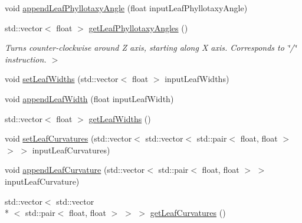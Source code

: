 \begin{DoxyCompactItemize}
void \hyperlink{classLSystemParameters_abfe638849fd39e447a12231b1ca22a50}{append\-Leaf\-Phyllotaxy\-Angle} (float input\-Leaf\-Phyllotaxy\-Angle)
\item 
std\-::vector$<$ float $>$ \hyperlink{classLSystemParameters_ad28db9029a6879362cd7af7f969c3f87}{get\-Leaf\-Phyllotaxy\-Angles} ()
\begin{DoxyCompactList}\small\item\em Turns counter-\/clockwise around Z axis, starting along X axis. Corresponds to \char`\"{}/\char`\"{} instruction. $>$ \end{DoxyCompactList}\item 
void \hyperlink{classLSystemParameters_a8518e051415f3684548081ebe4e6d079}{set\-Leaf\-Widths} (std\-::vector$<$ float $>$ input\-Leaf\-Widths)
\item 
void \hyperlink{classLSystemParameters_a5ba39d60b7c69f087292d1a69468611f}{append\-Leaf\-Width} (float input\-Leaf\-Width)
\item 
std\-::vector$<$ float $>$ \hyperlink{classLSystemParameters_ae8236379ad72509c59c784f08d9a752b}{get\-Leaf\-Widths} ()
\item 
void \hyperlink{classLSystemParameters_a1dc078c5bc7d25a951c523bd8bbd16db}{set\-Leaf\-Curvatures} (std\-::vector$<$ std\-::vector$<$ std\-::pair$<$ float, float $>$ $>$ $>$ input\-Leaf\-Curvatures)
\item 
void \hyperlink{classLSystemParameters_a3db8d293bc9d8a7d50f93202f88be317}{append\-Leaf\-Curvature} (std\-::vector$<$ std\-::pair$<$ float, float $>$ $>$ input\-Leaf\-Curvature)
\item 
std\-::vector$<$ std\-::vector\\*
$<$ std\-::pair$<$ float, float $>$ $>$ $>$ \hyperlink{classLSystemParameters_a127b9e85d7d1f6071f720709d324be88}{get\-Leaf\-Curvatures} ()
\end{DoxyCompactItemize}
